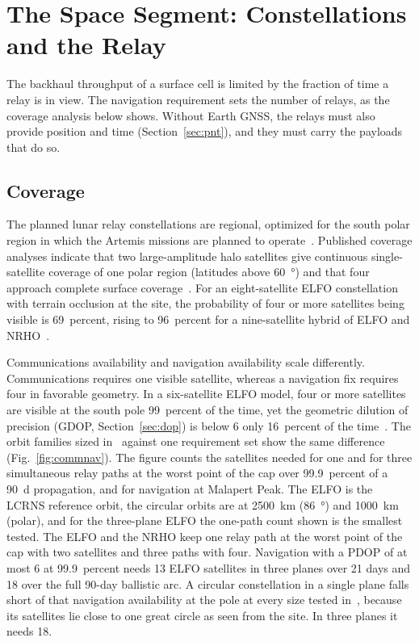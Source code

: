 \documentclass{IEEEoj}
\begin{document}
\section{The Space Segment: Constellations and the Relay}
\label{sec:space}
The backhaul throughput of a surface cell is limited by the fraction of time a relay is in view. The navigation requirement sets the number of relays, as the coverage analysis below shows. Without Earth GNSS, the relays must also provide position and time (Section~\ref{sec:pnt}), and they must carry the payloads that do so.

\subsection{Coverage}
The planned lunar relay constellations are regional, optimized for the south polar region in which the Artemis missions are planned to operate~\cite{lcrns_ref_const,esa_moonlight_csc}. Published coverage analyses indicate that two large-amplitude halo satellites give continuous single-satellite coverage of one polar region (latitudes above \SI{60}{\degree}) and that four approach complete surface coverage~\cite{gao_halo_coverage}. For an eight-satellite ELFO constellation with terrain occlusion at the site, the probability of four or more satellites being visible is 69~percent, rising to 96~percent for a nine-satellite hybrid of ELFO and NRHO~\cite{zhang_elfo_occlusion}.

Communications availability and navigation availability scale differently. Communications requires one visible satellite, whereas a navigation fix requires four in favorable geometry. In a six-satellite ELFO model, four or more satellites are visible at the south pole 99~percent of the time, yet the geometric dilution of precision (GDOP, Section~\ref{sec:dop}) is below 6 only 16~percent of the time~\cite{baweja_dop}. The orbit families sized in~\cite{asok2027space} against one requirement set show the same difference (Fig.~\ref{fig:commnav}). The figure counts the satellites needed for one and for three simultaneous relay paths at the worst point of the cap over 99.9~percent of a \SI{90}{d} propagation, and for navigation at Malapert Peak. The ELFO is the LCRNS reference orbit, the circular orbits are at \SI{2500}{km} (\SI{86}{\degree}) and \SI{1000}{km} (polar), and for the three-plane ELFO the one-path count shown is the smallest tested. The ELFO and the NRHO keep one relay path at the worst point of the cap with two satellites and three paths with four. Navigation with a PDOP of at most 6 at 99.9~percent needs 13 ELFO satellites in three planes over 21 days and 18 over the full 90-day ballistic arc. A circular constellation in a single plane falls short of that navigation availability at the pole at every size tested in~\cite{asok2027space}, because its satellites lie close to one great circle as seen from the site. In three planes it needs 18.
\end{document}
